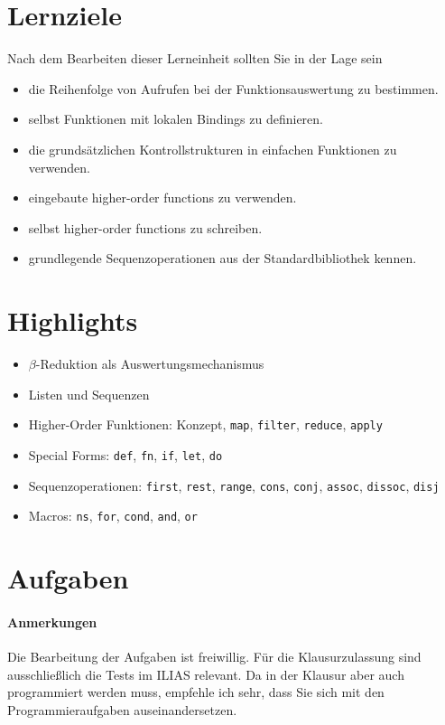 \documentclass[11pt,a4paper]{article}
\begin{document}
\section{Lernziele}

Nach dem Bearbeiten dieser Lerneinheit sollten Sie in der Lage sein

\begin{itemize}
    \item die Reihenfolge von Aufrufen bei der Funktionsauswertung zu bestimmen.
    \item selbst Funktionen mit lokalen Bindings zu definieren.
    \item die grunds\"atzlichen Kontrollstrukturen in einfachen Funktionen zu verwenden.
    \item eingebaute higher-order functions zu verwenden.
    \item selbst higher-order functions zu schreiben.
    \item grundlegende Sequenzoperationen aus der Standardbibliothek kennen.
\end{itemize}

\section{Highlights}

\begin{itemize}
    \item $\beta$-Reduktion als Auswertungsmechanismus
    \item Listen und Sequenzen
    \item Higher-Order Funktionen: Konzept, \verb|map|, \verb|filter|, \verb|reduce|, \verb|apply|
    \item Special Forms: \verb|def|, \verb|fn|, \verb|if|, \verb|let|, \verb|do|
    \item Sequenzoperationen: \verb|first|, \verb|rest|, \verb|range|, \verb|cons|, \verb|conj|, \verb|assoc|, \verb|dissoc|, \verb|disj|
    \item Macros: \verb|ns|, \verb|for|, \verb|cond|, \verb|and|, \verb|or|
\end{itemize}



\section{Aufgaben}

\paragraph{Anmerkungen}
Die Bearbeitung der Aufgaben ist freiwillig.
F\"ur die Klausurzulassung sind ausschlie\ss{}lich die Tests im ILIAS relevant.
Da in der Klausur aber auch programmiert werden muss,
empfehle ich sehr, dass Sie sich mit den Programmieraufgaben auseinandersetzen.
\end{document}
